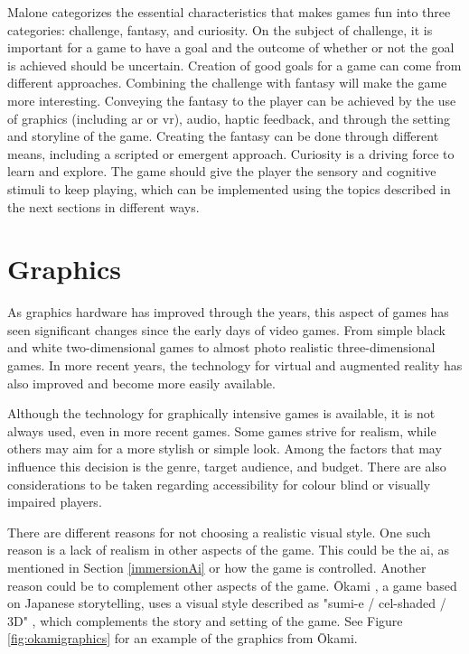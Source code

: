 Malone \cite{malone1980makes} categorizes the essential characteristics that makes games fun into three categories: challenge, fantasy, and curiosity.
On the subject of challenge, it is important for a game to have a goal and the outcome of whether or not the goal is achieved should be uncertain.
Creation of good goals for a game can come from different approaches.
Combining the challenge with fantasy will make the game more interesting.
Conveying the fantasy to the player can be achieved by the use of graphics (including \gls{ar} or \gls{vr}), audio, haptic feedback, and through the setting and storyline of the game.
Creating the fantasy can be done through different means, including a scripted or emergent approach.
Curiosity is a driving force to learn and explore.
The game should give the player the sensory and cognitive stimuli to keep playing, which can be implemented using the topics described in the next sections in different ways.


\section{Graphics}
\label{immersionGraphics}
As graphics hardware has improved through the years, this aspect of games has seen significant changes since the early days of video games.
From simple black and white two-dimensional games to almost photo realistic three-dimensional games.
In more recent years, the technology for virtual and augmented reality has also improved and become more easily available.

Although the technology for graphically intensive games is available, it is not always used, even in more recent games.
Some games strive for realism, while others may aim for a more stylish or simple look.
Among the factors that may influence this decision is the genre, target audience, and budget.
There are also considerations to be taken regarding accessibility for colour blind or visually impaired players.

There are different reasons for not choosing a realistic visual style.
One such reason is a lack of realism in other aspects of the game.
This could be the \gls{ai}, as mentioned in Section \ref{immersionAi} or how the game is controlled.
Another reason could be to complement other aspects of the game.
\={O}kami \cite{okami2006}, a game based on Japanese storytelling, uses a visual style described as "sumi-e / cel-shaded / 3D" \cite{donovan2013pretty}, which complements the story and setting of the game.
See Figure \ref{fig:okamigraphics} for an example of the graphics from \={O}kami.

